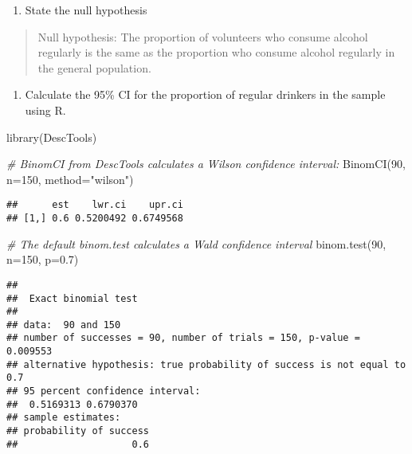 \documentclass[
]{memoir}
\newenvironment{Shaded}{\begin{snugshade}}{\end{snugshade}}
\newcommand{\AttributeTok}[1]{\textcolor[rgb]{0.77,0.63,0.00}{#1}}
\newcommand{\CommentTok}[1]{\textcolor[rgb]{0.56,0.35,0.01}{\textit{#1}}}
\newcommand{\DecValTok}[1]{\textcolor[rgb]{0.00,0.00,0.81}{#1}}
\newcommand{\FloatTok}[1]{\textcolor[rgb]{0.00,0.00,0.81}{#1}}
\newcommand{\FunctionTok}[1]{\textcolor[rgb]{0.00,0.00,0.00}{#1}}
\newcommand{\NormalTok}[1]{#1}
\newcommand{\StringTok}[1]{\textcolor[rgb]{0.31,0.60,0.02}{#1}}
\providecommand{\tightlist}{%
  \setlength{\itemsep}{0pt}\setlength{\parskip}{0pt}}
\begin{document}
\begin{enumerate}
\def\labelenumi{\alph{enumi})}
\tightlist
\item
  State the null hypothesis
\end{enumerate}

\begin{quote}
Null hypothesis: The proportion of volunteers who consume alcohol regularly is the same as the proportion who consume alcohol regularly in the general population.
\end{quote}

\begin{enumerate}
\def\labelenumi{\alph{enumi})}
\setcounter{enumi}{1}
\tightlist
\item
  Calculate the 95\% CI for the proportion of regular drinkers in the sample using R.
\end{enumerate}

\begin{Shaded}
\begin{Highlighting}[]
\FunctionTok{library}\NormalTok{(DescTools)}

\CommentTok{\# BinomCI from DescTools calculates a Wilson confidence interval:}
\FunctionTok{BinomCI}\NormalTok{(}\DecValTok{90}\NormalTok{, }\AttributeTok{n=}\DecValTok{150}\NormalTok{, }\AttributeTok{method=}\StringTok{"wilson"}\NormalTok{)}
\end{Highlighting}
\end{Shaded}

\begin{verbatim}
##      est    lwr.ci    upr.ci
## [1,] 0.6 0.5200492 0.6749568
\end{verbatim}

\begin{Shaded}
\begin{Highlighting}[]
\CommentTok{\# The default binom.test calculates a Wald confidence interval}
\FunctionTok{binom.test}\NormalTok{(}\DecValTok{90}\NormalTok{, }\AttributeTok{n=}\DecValTok{150}\NormalTok{, }\AttributeTok{p=}\FloatTok{0.7}\NormalTok{)}
\end{Highlighting}
\end{Shaded}

\begin{verbatim}
## 
##  Exact binomial test
## 
## data:  90 and 150
## number of successes = 90, number of trials = 150, p-value = 0.009553
## alternative hypothesis: true probability of success is not equal to 0.7
## 95 percent confidence interval:
##  0.5169313 0.6790370
## sample estimates:
## probability of success 
##                    0.6
\end{verbatim}
\end{document}
